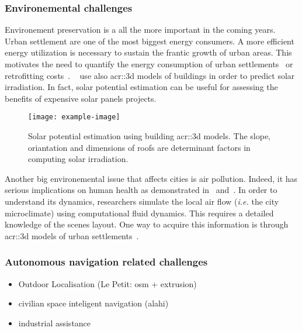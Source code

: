         \subsubsection{Environemental challenges}
        Environement preservation is a all the more important in the coming years.
        Urban settlement are one of the most biggest energy consumers.
        A more efficient energy utilization is necessary to sustain the frantic growth of urban areas.
        This motivates the need to quantify the energy consumption of urban settlements~\parencite{WATE20153372} or retrofitting costs~\parencite{previtali2014automatic}.
        ~\textcite{biljecki2015propagation} use also \gls{acr::3d} models of buildings in order to predict solar irradiation.
        In fact, solar potential estimation can be useful for assessing the benefits of expensive solar panels projects.\\
        \begin{figure}[h]
            \centering
            \texttt{[image: example-image]}             
            \caption{
                \label{fig::solar_potential} Solar potential estimation using building \gls{acr::3d} models.
                The slope, oriantation and dimensions of roofs are determinant factors in computing solar irradiation.
            }
        \end{figure}
        Another big environemental issue that affects cities is air pollution.
        Indeed, it has serious implications on human health as demonstrated in~\textcite{pascal2013assessing} and~\textcite{chen2013evidence}.
        In order to understand its dynamics, researchers simulate the local air flow (\textit{i.e.} the city microclimate) using computational fluid dynamics.
        This requires a detailed knowledge of the scenes layout.
        One way to acquire this information is through \gls{acr::3d} models of urban settlements~\parencite{ujang2013unified}.
        
        \subsubsection{Autonomous navigation related challenges}
        \begin{itemize}
            \item Outdoor Localisation (Le Petit: osm + extrusion)
            \item civilian space inteligent navigation (alahi)
            \item industrial assistance
        \end{itemize}
